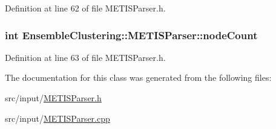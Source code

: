 Definition at line 62 of file M\-E\-T\-I\-S\-Parser.\-h.

\hypertarget{class_ensemble_clustering_1_1_m_e_t_i_s_parser_a50fd01e9082507c3cbb34b7194d8e047}{
\subsubsection[{node\-Count}]{\setlength{\rightskip}{0pt plus 5cm}int Ensemble\-Clustering\-::\-M\-E\-T\-I\-S\-Parser\-::node\-Count\hspace{0.3cm}{\ttfamily [protected]}}}\label{class_ensemble_clustering_1_1_m_e_t_i_s_parser_a50fd01e9082507c3cbb34b7194d8e047}


Definition at line 63 of file M\-E\-T\-I\-S\-Parser.\-h.



The documentation for this class was generated from the following files\-:\begin{DoxyCompactItemize}
\item 
src/input/\hyperlink{_m_e_t_i_s_parser_8h}{M\-E\-T\-I\-S\-Parser.\-h}\item 
src/input/\hyperlink{_m_e_t_i_s_parser_8cpp}{M\-E\-T\-I\-S\-Parser.\-cpp}\end{DoxyCompactItemize}
